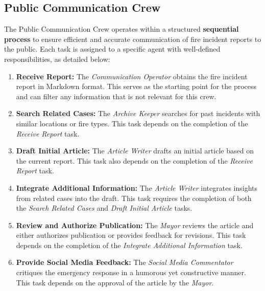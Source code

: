 \subsection{Public Communication Crew}

The Public Communication Crew operates within a structured \textbf{sequential process} to ensure efficient and accurate communication of fire incident reports to the public. Each task is assigned to a specific agent with well-defined responsibilities, as detailed below:

\begin{enumerate}
	\item \textbf{Receive Report:} The \textit{Communication Operator} obtains the fire incident report in Markdown format. This serves as the starting point for the process and can filter any information that is not relevant for this crew.
	\item \textbf{Search Related Cases:} The \textit{Archive Keeper} searches for past incidents with similar locations or fire types. This task depends on the completion of the \textit{Receive Report} task.
	\item \textbf{Draft Initial Article:} The \textit{Article Writer} drafts an initial article based on the current report. This task also depends on the completion of the \textit{Receive Report} task.
	\item \textbf{Integrate Additional Information:} The \textit{Article Writer} integrates insights from related cases into the draft. This task requires the completion of both the \textit{Search Related Cases} and \textit{Draft Initial Article} tasks.
	\item \textbf{Review and Authorize Publication:} The \textit{Mayor} reviews the article and either authorizes publication or provides feedback for revisions. This task depends on the completion of the \textit{Integrate Additional Information} task.
	\item \textbf{Provide Social Media Feedback:} The \textit{Social Media Commentator} critiques the emergency response in a humorous yet constructive manner. This task depends on the approval of the article by the \textit{Mayor}.
\end{enumerate}

